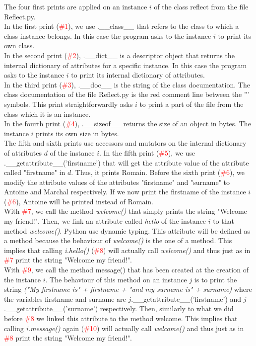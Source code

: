 The four first prints are applied on an instance $i$ of the class reflect from the file Reflect.py.\\
In the first print (\textcolor{red}{\#1}), we use .\_\_class\_\_ that refers to the class to which a class instance belongs. In this case the program asks to the instance $i$ to print its own class.\\
In the second print (\textcolor{red}{\#2}), .\_\_dict\_\_ is a descriptor object that returns the internal dictionary of attributes for a specific instance. In this case the program asks to the instance $i$ to print its internal dictionary of attributes.\\
In the third print (\textcolor{red}{\#3}), .\_\_doc\_\_ is the string of the class documentation. The class documentation of the file Reflect.py is the red comment line between the ''' symbols. This print straightforwardly asks $i$ to print a part of the file from the class which it is an instance.\\ 
In the fourth print (\textcolor{red}{\#4}), .\_\_sizeof\_\_ returns the size of an object in bytes. The instance $i$ prints its own size in bytes.\\

The fifth and sixth prints use accessors and mutators on the internal dictionary of attributes $d$ of the instance $i$.
In the fifth print (\textcolor{red}{\#5}), we use .\_\_getattribute\_\_('firstname') that will get the attribute value of the attribute called "firstname" in $d$. Thus, it prints Romain.
Before the sixth print (\textcolor{red}{\#6}), we modify the attribute values of the attributes "firstname" and "surname" to Antoine and Marchal respectively. If we now print the firstname of the instance $i$ (\textcolor{red}{\#6}), Antoine will be printed instead of Romain.\\

With \textcolor{red}{\#7}, we call the method \emph{welcome()} that simply prints the string "Welcome my friend!". Then, we link an attribute called \emph{hello} of the instance $i$ to that method \emph{welcome()}. Python use dynamic typing. This attribute will be defined as a method because the behaviour of \emph{welcome()} is the one of a method. This implies that calling \emph{i.hello()} (\textcolor{red}{\#8}) will actually call \emph{welcome()} and thus just as in \textcolor{red}{\#7} print the string "Welcome my friend!".\\

With \textcolor{red}{\#9}, we call the method message() that has been created at the creation of the instance $i$. The behaviour of this method on an instance $j$ is to print the string \emph{("My firstname is" + firstname + "and my surname is" + surname)} where the variables firstname and surname are $j$.\_\_getattribute\_\_(’firstname’) and $j$.\_\_getattribute\_\_(’surname’) respectively. Then, similarly to what we did before \textcolor{red}{\#8} we linked this attribute to the method welcome. This implies that calling \emph{i.message()} again (\textcolor{red}{\#10}) will actually call \emph{welcome()} and thus just as in \textcolor{red}{\#8} print the string "Welcome my friend!".\\

